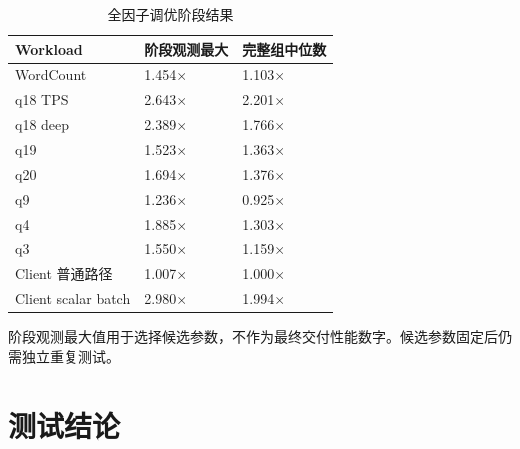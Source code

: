 \documentclass[a4paper,11pt]{article}
\begin{document}
\begin{table}[H]
\centering
\small
\begin{tabularx}{\textwidth}{X R{3.0cm} R{3.0cm}}
\toprule
\textbf{Workload} & \textbf{阶段观测最大} & \textbf{完整组中位数} \\
\midrule
WordCount & 1.454$\times$ & 1.103$\times$ \\
q18 TPS & 2.643$\times$ & 2.201$\times$ \\
q18 deep & 2.389$\times$ & 1.766$\times$ \\
q19 & 1.523$\times$ & 1.363$\times$ \\
q20 & 1.694$\times$ & 1.376$\times$ \\
q9 & 1.236$\times$ & 0.925$\times$ \\
q4 & 1.885$\times$ & 1.303$\times$ \\
q3 & 1.550$\times$ & 1.159$\times$ \\
Client 普通路径 & 1.007$\times$ & 1.000$\times$ \\
Client scalar batch & 2.980$\times$ & 1.994$\times$ \\
\bottomrule
\end{tabularx}
\caption{全因子调优阶段结果}
\end{table}

阶段观测最大值用于选择候选参数，不作为最终交付性能数字。候选参数固定后仍需独立重复测试。

\section{测试结论}
\end{document}
